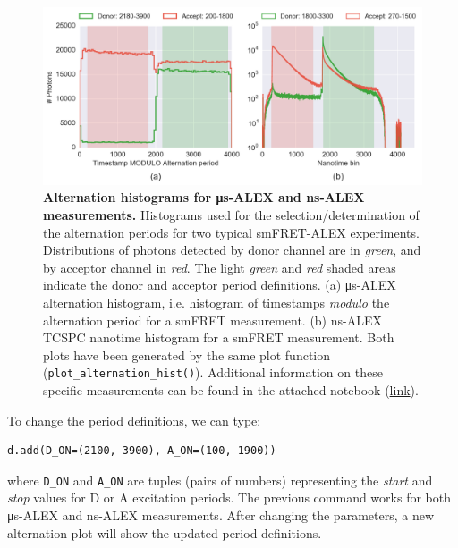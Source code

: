 \documentclass[10pt,letterpaper]{article}
\begin{document}
\begin{figure}[h!]
\begin{center}
\includegraphics[width=1\columnwidth]{figures/ALEX_alternation_double/ALEX_alternation_double}
\caption{\label{fig:altern_hist_double} 
\textbf{Alternation histograms for μs-ALEX and ns-ALEX measurements.}
Histograms used for the selection/determination
of the alternation periods for two typical smFRET-ALEX experiments.
Distributions of photons detected by donor channel are in \textit{green}, 
and by acceptor channel in \textit{red}.
The light \textit{green} and \textit{red} shaded areas indicate the donor 
and acceptor period definitions.
(a) μs-ALEX alternation histogram, i.e. histogram of timestamps \textit{modulo} 
the alternation period for a smFRET measurement. 
(b) ns-ALEX TCSPC nanotime histogram for a smFRET measurement.
Both plots have been generated by the same plot function 
(\texttt{plot\_alternation\_hist()}).
Additional information on these specific measurements can be found in the 
attached notebook
(\href{http://nbviewer.jupyter.org/github/tritemio/fretbursts_paper/blob/master/notebooks/Figures\%20-\%20ALEX\%20histograms.ipynb}{link}).%
}
\end{center}
\end{figure}


To change the period definitions, we can type:

\begin{lstlisting}
d.add(D_ON=(2100, 3900), A_ON=(100, 1900))
\end{lstlisting}

where \verb|D_ON| and \verb|A_ON| are tuples (pairs of numbers) representing
the \textit{start} and \textit{stop} values for D or A excitation periods.
The previous command works for both μs-ALEX and ns-ALEX measurements.
After changing the parameters, a new alternation plot will show the updated
period definitions.
\end{document}
